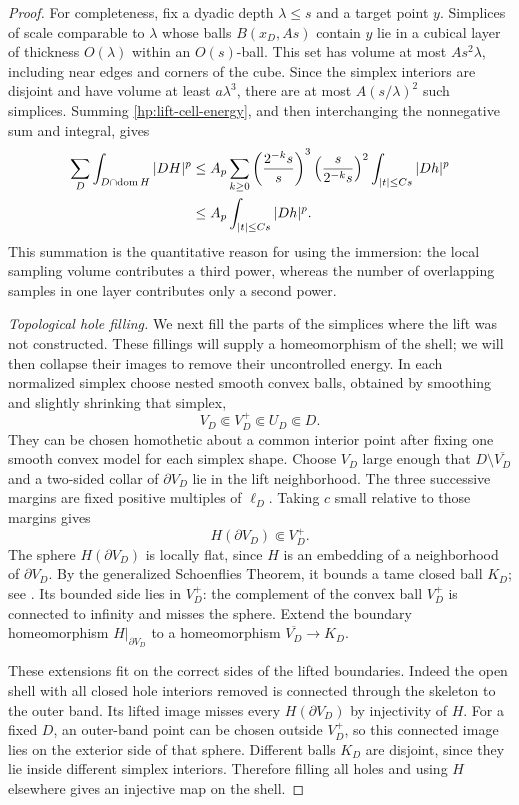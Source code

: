 \begin{proof}
For completeness, fix a dyadic depth $\lambda\leq s$ and a target
point $y$.  Simplices of scale comparable to $\lambda$ whose balls
$B(x_D,As)$ contain $y$ lie in a cubical layer of thickness
$O(\lambda)$ within an $O(s)$-ball.  This set has volume at most
$As^2\lambda$, including near edges and corners of the cube.  Since
the simplex interiors are disjoint and have volume at least
$a\lambda^3$, there are at most $A(s/\lambda)^2$ such simplices.
Summing \eqref{hp:lift-cell-energy}, and then interchanging the
nonnegative sum and integral, gives
\begin{align}
 \sum_D\int_{D\cap\operatorname{dom}H}|DH|^p
 &\leq A_p\sum_{k\geq0}
        \left(\frac{2^{-k}s}{s}\right)^3
        \left(\frac{s}{2^{-k}s}\right)^2
        \int_{|t|\leq Cs}|Dh|^p\notag\\
 &\leq A_p\int_{|t|\leq Cs}|Dh|^p.
 \label{hp:lift-total-energy}
\end{align}
This summation is the quantitative reason for using the immersion:
the local sampling volume contributes a third power, whereas the
number of overlapping samples in one layer contributes only a second
power.

\emph{Topological hole filling.}
We next fill the parts of the simplices where the lift was not
constructed.  These fillings will supply a homeomorphism of the shell;
we will then collapse their images to remove their uncontrolled energy.  In each normalized simplex choose nested smooth convex
balls, obtained by smoothing and slightly shrinking that simplex,
\[
 V_D\Subset V_D^+\Subset U_D\Subset D.
\]
They can be chosen homothetic about a common interior point after
fixing one smooth convex model for each simplex shape.  Choose $V_D$
large enough that $D\setminus\overline{V_D}$ and a two-sided collar
of $\partial V_D$ lie in the lift neighborhood.  The three successive
margins are fixed positive multiples of $\ell_D$.  Taking $c$ small
relative to those margins gives
\[
 H(\partial V_D)\Subset V_D^+.
\]
The sphere $H(\partial V_D)$ is locally flat, since $H$ is an embedding
of a neighborhood of $\partial V_D$.  By the generalized Schoenflies
Theorem, it bounds a tame closed ball $K_D$; see
\cite[Theorem~5]{Brown1960}.  Its bounded side lies in $V_D^+$:
the complement of the convex ball $V_D^+$ is connected to infinity
and misses the sphere.  Extend the boundary homeomorphism
$H|_{\partial V_D}$ to a homeomorphism
$\overline{V_D}\to K_D$.

These extensions fit on the correct sides of the lifted boundaries.
Indeed the open shell with all closed hole interiors removed is
connected through the skeleton to the outer band.  Its lifted image
misses every $H(\partial V_D)$ by injectivity of $H$.  For a fixed
$D$, an outer-band point can be chosen outside $V_D^+$, so this
connected image lies on the exterior side of that sphere.  Different
balls $K_D$ are disjoint, since they lie inside different simplex
interiors.  Therefore filling all holes and using $H$ elsewhere gives
an injective map on the shell.


\end{proof}
